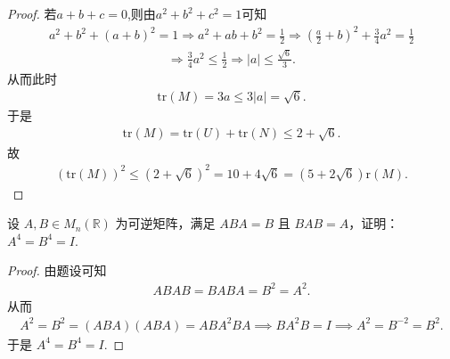 \documentclass[../../main.tex]{subfiles}%
\begin{document}
\begin{proof}
若$a+b+c=0$,则由$a^2+b^2+c^2=1$可知
\begin{align*}
a^2+b^2+(a+b)^2=1\Rightarrow a^2+ab+b^2=\frac{1}{2}\Rightarrow \left( \frac{a}{2}+b \right) ^2+\frac{3}{4}a^2=\frac{1}{2}
\end{align*}
\begin{align*}
\Rightarrow \frac{3}{4}a^2\leqslant \frac{1}{2}\Rightarrow |a|\leqslant \frac{\sqrt{6}}{3}.
\end{align*}
从而此时
\begin{align*}
\mathrm{tr}(M) =3a\leqslant 3|a|=\sqrt{6}.
\end{align*}
于是
\begin{align*}
\mathrm{tr}(M) =\mathrm{tr}(U) +\mathrm{tr}(N) \leqslant 2+\sqrt{6}.
\end{align*}
故
\begin{align*}
(\mathrm{tr}(M))^2\leqslant \left( 2+\sqrt{6} \right) ^2=10+4\sqrt{6}=\left( 5+2\sqrt{6} \right) \mathrm{r}(M).
\end{align*}
\end{proof}

\begin{example}
设 $A, B \in M_n(\mathbb{R})$ 为可逆矩阵，满足 $ABA = B$ 且 $BAB = A$，证明：$A^4 = B^4 = I$.
\end{example}
\begin{proof}
由题设可知
\begin{align*}
ABAB = BABA = B^2 = A^2.
\end{align*}
从而
\begin{align*}
A^2 = B^2 = (ABA)(ABA) = ABA^2 BA \implies BA^2 B = I \implies A^2 = B^{-2} = B^2.
\end{align*}
于是 $A^4 = B^4 = I$.
\end{proof}
\end{document}
